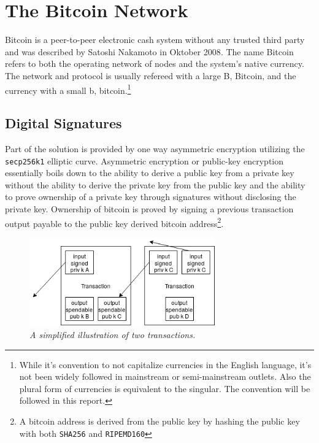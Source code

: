 \chapter{The Bitcoin Network}
	\label{sec:bitcoin}

Bitcoin is a peer-to-peer electronic cash system without any trusted third party and was described by Satoshi Nakamoto in Oktober 2008\cite{nakamoto:bitcoin}. The name Bitcoin refers to both the operating network of nodes and the system's native currency. The network and protocol is usually refereed with a large B, Bitcoin, and the currency with a small b, bitcoin.\footnote{While it's convention to not capitalize currencies in the English language, it's not been widely followed in mainstream or semi-mainstream outlets. Also the plural form of currencies is equivalent to the singular. The convention will be followed in this report.}

\section{Digital Signatures}

Part of the solution is provided by one way asymmetric encryption utilizing the \texttt{secp256k1} elliptic curve. Asymmetric encryption or public-key encryption essentially boils down to the ability to derive a public key from a private key without the ability to derive the private key from the public key and the ability to prove ownership of a private key through signatures without disclosing the private key. Ownership of bitcoin is proved by signing a previous transaction output payable to the public key derived bitcoin address\footnote{A bitcoin address is derived from the public key by hashing the public key with both \texttt{SHA256} and \texttt{RIPEMD160}}. 

\begin{figure}[!htb]
	\hspace*{-2cm} 
	\centering
	\includegraphics[width=8cm]{transaction.png}
	\caption{\textit{A simplified illustration of two transactions. 
	}}
	\label{fig:merkle:tree}
	\hspace*{2mm} 	
\end{figure}

